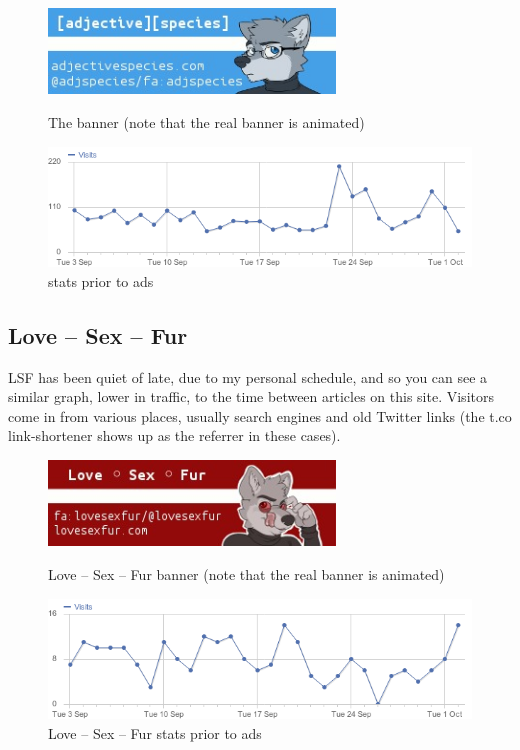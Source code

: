 \begin{figure}
  \begin{center}
    \includegraphics[width=3in]{content/assets/ads--adjspecies-ad}
  \end{center}
  \caption{The \adsp banner (note that the real banner is animated)}
  \begin{center}
    \includegraphics[width=\textwidth]{content/assets/ads--as-preads}
  \end{center}
  \caption{\adsp stats prior to ads}
\end{figure}


\subsection*{Love -- Sex -- Fur}

LSF has been quiet of late, due to my personal schedule, and so you can see a similar graph, lower in traffic, to the time between articles on this site. Visitors come in from various places, usually search engines and old Twitter links (the t.co link-shortener shows up as the referrer in these cases).

\begin{figure}
  \begin{center}
    \includegraphics[width=3in]{content/assets/ads--lovesexfur-ad}
  \end{center}
  \caption{Love -- Sex -- Fur banner (note that the real banner is animated)}
  \begin{center}
    \includegraphics[width=\textwidth]{content/assets/ads--lsf-preads}
  \end{center}
  \caption{Love -- Sex -- Fur stats prior to ads}
\end{figure}

